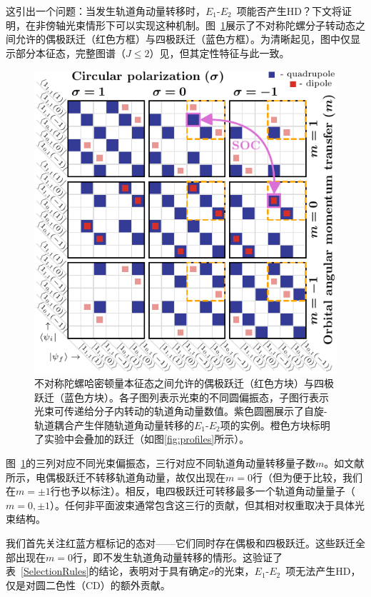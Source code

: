 \documentclass[reprint,aps,prl,twocolumn,superscriptaddress,groupedaddress]{revtex4-2}
\newcommand{\eoet}{$E_1$-$E_2$}
\begin{document}
这引出一个问题：当发生轨道角动量转移时，\eoet~项能否产生HD？下文将证明，在非傍轴光束情形下可以实现这种机制。图~\ref{fig:gridJ1}展示了不对称陀螺分子转动态之间允许的偶极跃迁（红色方框）与四极跃迁（蓝色方框）。为清晰起见，图中仅显示部分本征态，完整图谱（$J\leq 2$）见\cite{Note1}，但其定性特征与此一致。

\begin{figure}[ht!]
    \centering
    \includegraphics[width=\linewidth]{Figure1.pdf}
    \caption{不对称陀螺哈密顿量本征态之间允许的偶极跃迁（红色方块）与四极跃迁（蓝色方块）。各子图列表示光束的不同圆偏振态，子图行表示光束可传递给分子内转动的轨道角动量数值。紫色圆圈展示了自旋-轨道耦合产生伴随轨道角动量转移的\eoet 项的实例。橙色方块标明了实验中会叠加的跃迁（如图\ref{fig:profiles}所示）。}
    \label{fig:gridJ1}
\end{figure}
图~\ref{fig:gridJ1}的三列对应不同光束偏振态，三行对应不同轨道角动量转移量子数$m$。如文献\cite{Maslov2024,Maslov_Thesis}所示，电偶极跃迁不转移轨道角动量，故仅出现在$m=0$行（但为便于比较，我们在$m=\pm 1$行也予以标注）。相反，电四极跃迁可转移最多一个轨道角动量量子（$m=0,\pm 1$）。任何非平面波束通常包含这三行的贡献，但其相对权重取决于具体光束结构。

我们首先关注红蓝方框标记的态对——它们同时存在偶极和四极跃迁。这些跃迁全部出现在$m=0$行，即不发生轨道角动量转移的情形。这验证了表~\ref{SelectionRules}的结论，表明对于具有确定$\sigma$的光束，\eoet~项无法产生HD，仅是对圆二色性（CD）的额外贡献。
\end{document}
